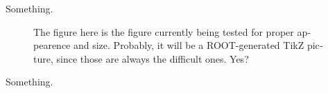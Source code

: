 

\begin{english}

Something.

\begin{figure}

\centering
\begin{minipage}{.69\textwidth}
\begin{infilsf} \tiny

\end{infilsf}
\end{minipage}
\caption{The figure here is the figure currently being tested for
  proper appearence and size. Probably, it will be a ROOT-generated
  TikZ picture, since those are always the difficult ones. Yes?}
\label{fig:my_label}
\end{figure}

Something.

\end{english}
